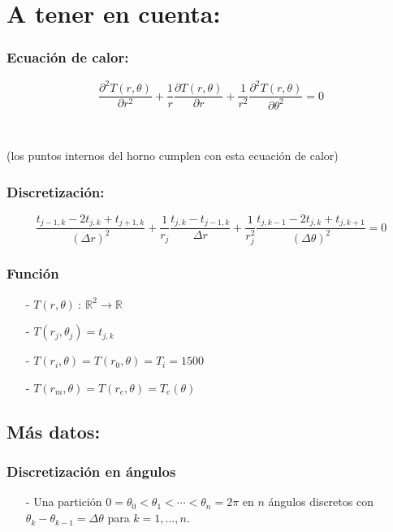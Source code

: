 \documentclass{article}
\title{}
\author{}
\date{}
\begin{document}
\section*{A tener en cuenta:}

\subsubsection*{Ecuación de calor:}

\[\frac{\partial^2 T(r,\theta)}{\partial r^2} + 
\frac{1}{r}\frac{\partial T(r,\theta)}{\partial r} + 
\frac{1}{r^2}\frac{\partial^2 T(r,\theta)}{\partial \theta^2} = 0\]

\

\noindent \small{(los puntos internos del horno cumplen con esta ecuación de calor)}

\subsubsection*{Discretización:}

\[\frac{t_{j-1,k} - 2t_{j,k} + t_{j+1,k}}{{(\Delta r)}^2} + 
\frac{1}{r_j}\frac{t_{j,k} - t_{j-1,k}}{\Delta r} + 
\frac{1}{r_{j}^{2}}\frac{t_{j,k-1} - 2t_{j,k} + t_{j,k+1}}{{(\Delta \theta)}^2} = 0\]

\subsubsection*{Función}

\begin{itemize}
    \item[-] $T(r,\theta)~:~\mathbb{R}^{2} \to \mathbb{R}$
    \item[-] $T(r_j, \theta_j) = t_{j,k}$
    \item[-] $T(r_i, \theta) = T(r_0, \theta) = T_i = 1500$
    \item[-] $T(r_m, \theta) = T(r_e, \theta) = T_{e}(\theta)$
\end{itemize}

\subsection*{Más datos:}

\subsubsection*{Discretización en ángulos}
\begin{itemize}
    \item[-] Una partición $0 = \theta_{0} < \theta_{1} < \cdots < \theta_{n} = 2\pi$ en $n$ ángulos discretos con
            $\theta_{k} - \theta_{k-1} = \Delta\theta$ para $k=1,\ldots,n$.
\end{itemize}
\end{document}

